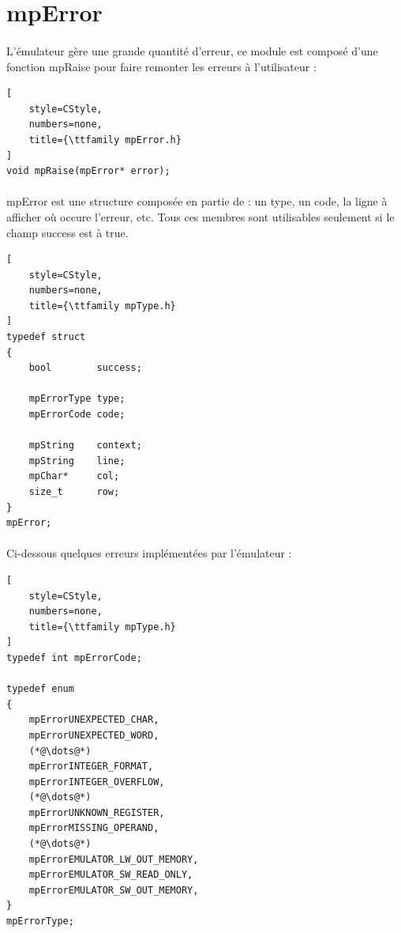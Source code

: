 \documentclass[12pt]{report} %
\begin{document}
\section{mpError}

\paragraph{}
L'émulateur gère une grande quantité d'erreur, ce module est composé d'une fonction {\ttfamily mpRaise} pour faire remonter les erreurs à l'utilisateur :

\begin{lstlisting}[
    style=CStyle,
    numbers=none,
    title={\ttfamily mpError.h}
]
void mpRaise(mpError* error);
\end{lstlisting}

\paragraph{}
{\ttfamily mpError} est une structure composée en partie de : un type, un code, la ligne à afficher où occure l'erreur, etc. Tous ces membres sont utilisables seulement si le champ {\ttfamily success} est à true.

\begin{lstlisting}[
    style=CStyle,
    numbers=none,
    title={\ttfamily mpType.h}
]
typedef struct
{
    bool        success;

    mpErrorType type;
    mpErrorCode code;

    mpString    context;
    mpString    line;
    mpChar*     col;
    size_t      row;
}
mpError;
\end{lstlisting}

\paragraph{}
Ci-dessous quelques erreurs implémentées par l'émulateur :

\begin{lstlisting}[
    style=CStyle,
    numbers=none,
    title={\ttfamily mpType.h}
]
typedef int mpErrorCode;

typedef enum
{
    mpErrorUNEXPECTED_CHAR,
    mpErrorUNEXPECTED_WORD,
    (*@\dots@*)
    mpErrorINTEGER_FORMAT,
    mpErrorINTEGER_OVERFLOW,
    (*@\dots@*)
    mpErrorUNKNOWN_REGISTER,
    mpErrorMISSING_OPERAND,
    (*@\dots@*)
    mpErrorEMULATOR_LW_OUT_MEMORY,
    mpErrorEMULATOR_SW_READ_ONLY,
    mpErrorEMULATOR_SW_OUT_MEMORY,
}
mpErrorType;
\end{lstlisting}
\end{document}

